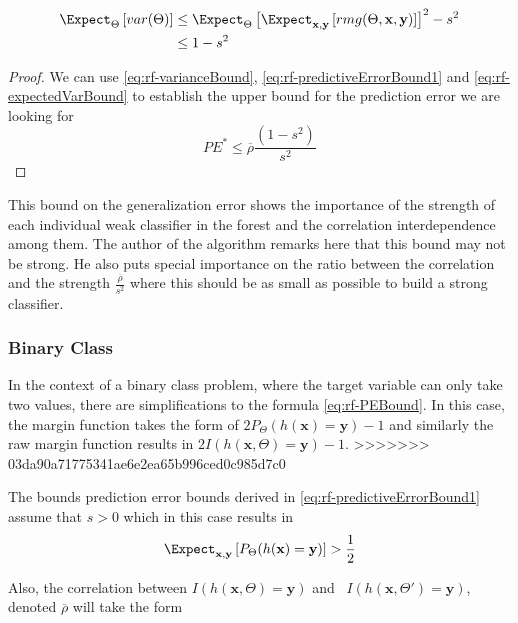 \begin{equation}\label{eq:rf-expectedVarBound}
\begin{split}
\Expect_{\Theta} \left[ var(\Theta) \right]  & \leq \Expect_{\Theta} \left[ \Expect_{\textbf{x},\textbf{y}}\left[ rmg(\Theta,\textbf{x},\textbf{y})   \right]  \right]^2 -s^2  \\
& \leq 1-s^2
\end{split}
\end{equation}

\begin{proof}
	We can use  \ref{eq:rf-varianceBound}, \ref{eq:rf-predictiveErrorBound1} and \ref{eq:rf-expectedVarBound} to establish the upper bound for the prediction error we are looking for
	\begin{equation}\label{eq:rf-PEBound}
	PE^* \leq \overline{\rho}\frac{(1-s^2)}{s^2}
	\end{equation}
\end{proof}

This bound on the generalization error shows the importance of the strength of each individual weak classifier in the forest and the correlation interdependence among them. The author \cite{breiman-randomforests} of the algorithm remarks here that this bound may not be strong. He also puts special importance on the ratio between the correlation and the strength $\frac{\overline{\rho}}{s^2}$ where this should be as small as possible to build a strong classifier. 
\subsubsection{Binary Class}
In the context of a binary class problem, where the target variable can only take two values, there are simplifications to the formula \ref{eq:rf-PEBound}. In this case, the margin function takes the form of $2 P_{\Theta}(h(\textbf{x}) = \textbf{y}) -1$ and similarly the raw margin function results in $2 I(h(\textbf{x}, \Theta) = \textbf{y}) -1$. 
>>>>>>> 03da90a71775341ae6e2ea65b996ced0c985d7c0

The bounds prediction error bounds derived in \ref{eq:rf-predictiveErrorBound1} assume that $s >0$ which in this case results in
$$ \Expect_{\textbf{x},\textbf{y}} \left[ P_{\Theta}(h(\textbf{x}) = \textbf{y}) \right] > \frac{1}{2} $$

Also, the correlation between $I(h(\textbf{x}, \Theta) = \textbf{y})$ and \  $I(h(\textbf{x}, \Theta') = \textbf{y})$, denoted $\overline{\rho}$ will take the form

